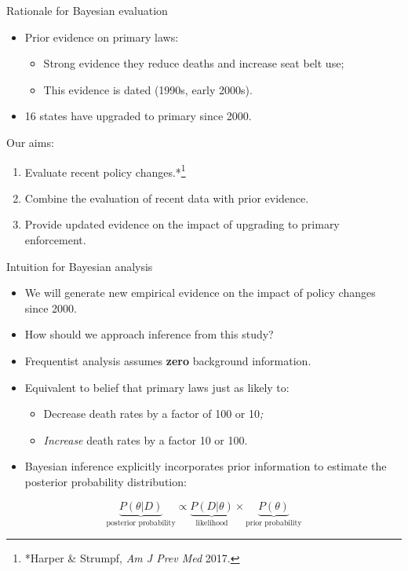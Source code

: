 \documentclass[english]{beamer}\usepackage[]{graphicx}\usepackage[]{color}
\begin{document}
%
\begin{frame}{Rationale for Bayesian evaluation}
\begin{itemize}
\item Prior evidence on primary laws:
\begin{itemize}
\item Strong evidence they reduce deaths and increase seat belt use;
\item This evidence is dated (1990s, early 2000s).\medskip{}
\end{itemize}
\item 16 states have upgraded to primary since 2000.

\medskip{}

\end{itemize}
Our aims:
\begin{enumerate}
\item Evaluate recent policy changes.{*}\footnote{{*}Harper \& Strumpf, \textit{Am J Prev Med} 2017.}
\item Combine the evaluation of recent data with prior evidence.
\item Provide updated evidence on the impact of upgrading to primary enforcement.
\end{enumerate}
\end{frame}
%
\begin{frame}{Intuition for Bayesian analysis}
\begin{itemize}
\item We will generate new empirical evidence on the impact of policy changes
since 2000.
\item How should we approach inference from this study?\medskip{}
\end{itemize}

\pause{}
\begin{itemize}
\item Frequentist analysis assumes \textbf{zero} background information.
\item Equivalent to belief that primary laws just as likely to:
\begin{itemize}
\item Decrease death rates by a factor of 100 or 10\textit{;}
\item \textit{Increase} death rates by a factor 10 or 100.
\end{itemize}
\medskip{}

\end{itemize}

\pause{}
\begin{itemize}
\item Bayesian inference explicitly incorporates prior information to estimate
the posterior probability distribution:
\end{itemize}
\[
\underbrace{P(\theta|D)}_{\textrm{posterior probability}}\propto\underbrace{P(D|\theta)}_{\textrm{ likelihood }}\times\underbrace{P(\theta)}_{\textrm{prior probability}}
\]

\end{frame}
\end{document}
